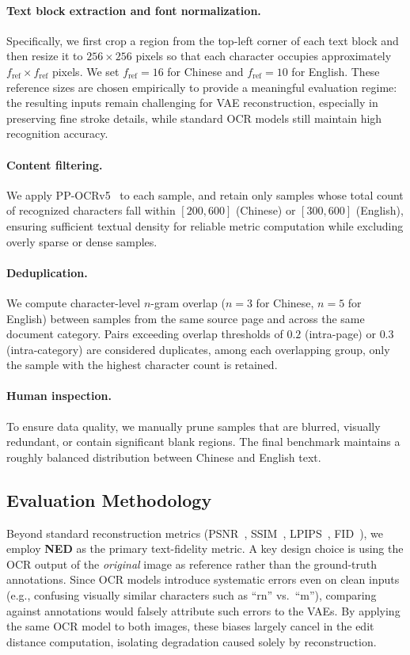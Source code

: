 \documentclass{llmxive}
\begin{document}
\paragraph{Text block extraction and font normalization.}
Specifically, we first crop a region from the top-left corner of each text block and then resize it to $256\!\times\!256$ pixels so that each character occupies approximately 
$f_{\text{ref}}\!\times\!f_{\text{ref}}$ pixels. We set 
$f_{\text{ref}}\!=\!16$ for Chinese and  $f_{\text{ref}}\!=\!10$ for English. These reference sizes are chosen empirically to provide a meaningful evaluation regime: the resulting inputs remain challenging for VAE reconstruction, especially in preserving fine stroke details, while standard OCR models still maintain high recognition accuracy.

\paragraph{Content filtering.}
We apply PP-OCRv5~\citep{cui2025paddleocr30technicalreport} to each sample, and retain only samples whose total count of recognized characters fall within $[200, 600]$ (Chinese) or $[300, 600]$ (English), ensuring sufficient textual density for reliable metric computation while excluding overly sparse or dense samples.

\paragraph{Deduplication.}
We compute character-level $n$-gram overlap ($n\!=\!3$ for Chinese, $n\!=\!5$ for English) between samples from the same source page and across the same document category. Pairs exceeding overlap thresholds of $0.2$ (intra-page) or $0.3$ (intra-category) are considered duplicates, among each overlapping group, only the sample with the highest character count is retained.

\paragraph{Human inspection.}
To ensure data quality, we manually prune samples that are blurred, visually redundant, or contain significant blank regions. The final benchmark maintains a roughly balanced distribution between Chinese and English text.

\subsection{Evaluation Methodology}
Beyond standard reconstruction metrics (PSNR~\citep{psnr}, SSIM~\citep{ssim}, LPIPS~\citep{lpips}, FID~\citep{fid}), we employ \textbf{NED} as the primary text-fidelity metric. A key design choice is using the OCR output of the \emph{original} image as reference rather than the ground-truth annotations. Since OCR models introduce systematic errors even on clean inputs (e.g., confusing visually similar characters such as ``rn'' vs.\ ``m''), comparing against annotations would falsely attribute such errors to the VAEs. By applying the same OCR model to both images, these biases largely cancel in the edit distance computation, isolating degradation caused solely by reconstruction.
\end{document}
